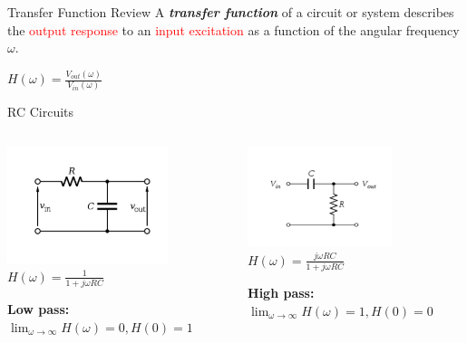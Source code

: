 
\begin{frame}{Transfer Function Review}
        A \textbf{\emph{transfer function}} of a circuit or system describes the \textcolor{red}{output response} to an \textcolor{red}{input excitation} as a function of the angular frequency $\omega$.
        \begin{center}
            $H(\omega) = \frac{V_{out}(\omega)}{V_{in}(\omega)}$
        \end{center}
    \end{frame}

    \begin{frame}{RC Circuits}
        \begin{columns}
            \begin{column}{0.5\textwidth}
            \includegraphics[]{./images/rc-circuits_1.png}
                \vspace{2ex}
                $H(\omega) = \frac{1}{1 + j\omega RC}$
                \vspace{2ex}

                \textbf{Low pass:} $\lim_{\omega\to\infty} H(\omega) = 0, H(0) = 1$
            \end{column}
            \begin{column}{0.5\textwidth}
            \includegraphics[]{./images/rc-circuits_2.png}
                \vspace{2ex}
                $H(\omega) = \frac{j\omega RC}{1 + j\omega RC}$
                \vspace{2ex}

                \textbf{High pass:} $\lim_{\omega\to\infty} H(\omega) = 1, H(0) = 0$
            \end{column}
        \end{columns}
    \end{frame}
    
